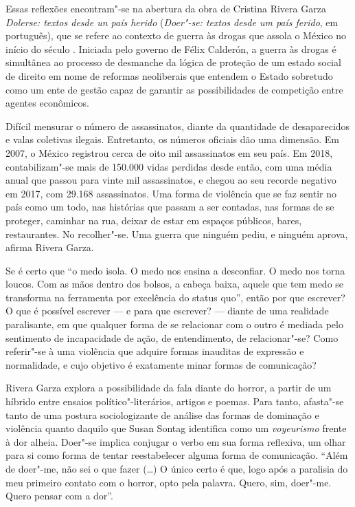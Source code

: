 Essas reflexões encontram"-se na abertura da obra de Cristina Rivera
Garza \emph{Dolerse: textos desde un país herido}
(\emph{Doer"-se: textos desde um país ferido}, em português), que se refere ao
contexto de guerra às drogas que assola o México no início do século
. Iniciada pelo governo de Félix Calderón, a guerra às drogas é
simultânea ao processo de desmanche da lógica de proteção de um estado
social de direito em nome de reformas neoliberais que entendem o Estado
sobretudo como um ente de gestão capaz de garantir as possibilidades de
competição entre agentes econômicos.

Difícil mensurar o número de assassinatos, diante da quantidade de
desaparecidos e valas coletivas ilegais. Entretanto, os números oficiais
dão uma dimensão. Em 2007, o México registrou cerca de oito mil
assassinatos em seu país. Em 2018, contabilizam"-se mais de 150.000 vidas
perdidas desde então, com uma média anual que passou para vinte mil
assassinatos, e chegou ao seu recorde negativo em 2017, com 29.168
assassinatos. Uma forma de violência que se faz sentir no país como um
todo, nas histórias que passam a ser contadas, nas formas de se
proteger, caminhar na rua, deixar de estar em espaços públicos, bares,
restaurantes. No recolher"-se. Uma guerra que ninguém pediu, e ninguém
aprova, afirma Rivera Garza.

Se é certo que ``o medo isola. O medo nos ensina a desconfiar. O medo
nos torna loucos. Com as mãos dentro dos bolsos, a cabeça baixa, aquele
que tem medo se transforma na ferramenta por excelência do status quo'',
então por que escrever? O que é possível escrever --- e para que
escrever? --- diante de uma realidade paralisante, em que qualquer forma
de se relacionar com o outro é mediada pelo sentimento de incapacidade
de ação, de entendimento, de relacionar"-se? Como referir"-se à uma
violência que adquire formas inauditas de expressão e normalidade, e
cujo objetivo é exatamente minar formas de comunicação?

Rivera Garza explora a possibilidade da fala diante do
horror, a partir de um híbrido entre ensaios político"-literários,
artigos e poemas. Para tanto, afasta"-se tanto de uma postura
sociologizante de análise das formas de dominação e violência quanto
daquilo que Susan Sontag identifica como um \emph{voyeurismo} frente à dor
alheia. Doer"-se implica conjugar o verbo em sua forma reflexiva, um
olhar para si como forma de tentar reestabelecer alguma forma de
comunicação. ``Além de doer"-me, não sei o que fazer (\ldots{}) O único
certo é que, logo após a paralisia do meu primeiro contato com o horror,
opto pela palavra. Quero, sim, doer"-me. Quero pensar com a dor''.

